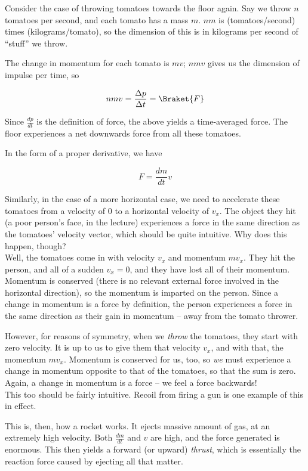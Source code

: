 Consider the case of throwing tomatoes towards the floor again. Say we throw $n$ tomatoes per second, and each tomato has a mass $m$. $n m$ is (tomatoes/second) times (kilograms/tomato), so the dimension of this is in kilograms per second of ``stuff'' we throw.

The change in momentum for each tomato is $m v$; $n m v$ gives us the dimension of impulse per time, so

\begin{equation}
n m v = \frac{\Delta p}{\Delta t} = \Braket{F}
\end{equation}

Since $\displaystyle \frac{dp}{dt}$ is the definition of force, the above yields a time-averaged force. The floor experiences a net downwards force from all these tomatoes.

In the form of a proper derivative, we have

\begin{equation}
F = \frac{dm}{dt} v
\end{equation}

Similarly, in the case of a more horizontal case, we need to accelerate these tomatoes from a velocity of 0 to a horizontal velocity of $v_x$. The object they hit (a poor person's face, in the lecture) experiences a force in the same direction as the tomatoes' velocity vector, which should be quite intuitive. Why does this happen, though?\\
Well, the tomatoes come in with velocity $v_x$ and momentum $m v_x$. They hit the person, and all of a sudden $v_x = 0$, and they have lost all of their momentum. Momentum is conserved (there is no relevant external force involved in the horizontal direction), so the momentum is imparted on the person. Since a change in momentum is a force by definition, the person experiences a force in the same direction as their gain in momentum -- away from the tomato thrower.

However, for reasons of symmetry, when we \emph{throw} the tomatoes, they start with zero velocity. It is up to us to give them that velocity $v_x$, and with that, the momentum $m v_x$. Momentum is conserved for us, too, so \emph{we} must experience a change in momentum opposite to that of the tomatoes, so that the sum is zero. Again, a change in momentum is a force -- we feel a force backwards!\\
This too should be fairly intuitive. Recoil from firing a gun is one example of this in effect.

This is, then, how a rocket works. It ejects massive amount of gas, at an extremely high velocity. Both $\displaystyle \frac{dm}{dt}$ and $v$ are high, and the force generated is enormous. This then yields a forward (or upward) \emph{thrust}, which is essentially the reaction force caused by ejecting all that matter.

